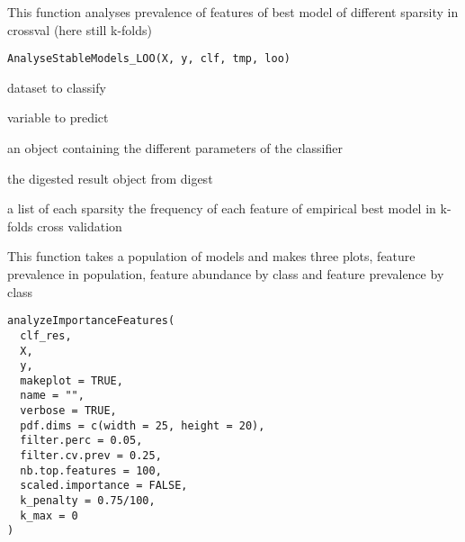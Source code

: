 \documentclass[a4paper]{book}
\begin{document}
%
\begin{Description}
This function analyses prevalence of features of best model of different sparsity in crossval (here still k-folds)
\end{Description}
%
\begin{Usage}
\begin{verbatim}
AnalyseStableModels_LOO(X, y, clf, tmp, loo)
\end{verbatim}
\end{Usage}
%
\begin{Arguments}
\begin{ldescription}
\item[\code{X:}] dataset to classify

\item[\code{y:}] variable to predict

\item[\code{clf:}] an object containing the different parameters of the classifier

\item[\code{tmp:}] the digested result object from digest
\end{ldescription}
\end{Arguments}
%
\begin{Value}
a list of each sparsity the frequency of each feature of empirical best model in k-folds cross validation
\end{Value}
%
\begin{Description}
This function takes a population of models and makes three plots, feature prevalence in population, 
feature abundance by class and feature prevalence by class
\end{Description}
%
\begin{Usage}
\begin{verbatim}
analyzeImportanceFeatures(
  clf_res,
  X,
  y,
  makeplot = TRUE,
  name = "",
  verbose = TRUE,
  pdf.dims = c(width = 25, height = 20),
  filter.perc = 0.05,
  filter.cv.prev = 0.25,
  nb.top.features = 100,
  scaled.importance = FALSE,
  k_penalty = 0.75/100,
  k_max = 0
)
\end{verbatim}
\end{Usage}
%
\end{document}
